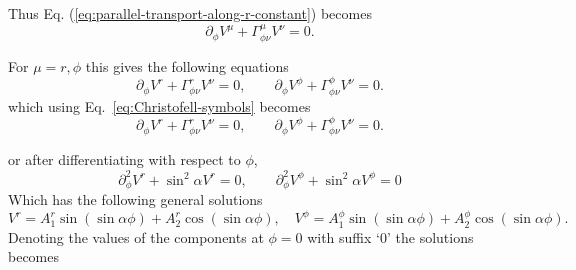 \documentclass[fleqn]{article}
\begin{document}
Thus Eq. (\ref{eq:parallel-transport-along-r-constant}) becomes 
\begin{equation}
  \label{eq:parallel-transport}
  \partial_\phi V^{\mu} + \Gamma^{\mu}_{\phi\nu}V^\nu = 0.
\end{equation}

For $\mu=r,\phi$ this gives the following equations
\begin{equation}
  \label{eq:r-phi}
  \partial_\phi V^{r} + \Gamma^{r}_{\phi\nu}V^\nu = 0,\qquad
  \partial_\phi V^{\phi} + \Gamma^{\phi}_{\phi\nu}V^\nu = 0.
\end{equation}
which using Eq.~\eqref{eq:Christofell-symbols} becomes
\begin{equation}
  \label{eq:r-phi-2}
 	 \partial_\phi V^{r} + \Gamma^{r}_{\phi\nu}V^\nu = 0,\qquad
  \partial_\phi V^{\phi} + \Gamma^{\phi}_{\phi\nu}V^\nu = 0.
\end{equation}

or after differentiating with respect to $\phi$,
\begin{equation}
  \label{eq:r-phi-3}
  \partial_\phi^2 V^r + \sin^2\alpha V^r = 0,\qquad   \partial_\phi^2 V^\phi + \sin^2\alpha V^\phi = 0
\end{equation}
Which has the following general solutions
\begin{equation}
  \label{eq:r-phi-solution}
  \boxed{V^r = A^r_1 \sin(\sin\alpha \phi) + A^r_2 \cos(\sin\alpha \phi),\quad V^\phi = A^\phi_1 \sin(\sin\alpha \phi) + A^\phi_2 \cos(\sin\alpha \phi)}.
\end{equation}
Denoting the values of the components at $\phi=0$ with suffix `0' the solutions becomes
\end{document}
